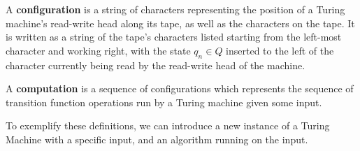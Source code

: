 \documentclass{article}
\begin{document}
\begin{defin}
	A \textbf{configuration} is a string of characters representing the position of a Turing machine's read-write head along its tape, as well as the characters on the tape.  It is written as a string of the tape's characters listed starting from the left-most character and working right, with the state $q_{n} \in Q$ inserted to the left of the character currently being read by the read-write head of the machine.
\end{defin}
\begin{defin}
	A \textbf{computation} is a sequence of configurations which represents the sequence of transition function operations run by a Turing machine given some input. \cite{6}
\end{defin}
\noindent To exemplify these definitions, we can introduce a new instance of a Turing Machine with a specific input, and an algorithm running on the input.
\end{document}
